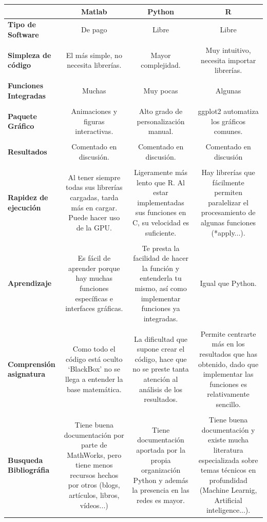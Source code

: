 \documentclass{article}
\begin{document}
\setlength{\tymin}{50pt}
\let\raggedright\RaggedRight
\begin{tabulary}{\textwidth}{LCCC}
\hline
&\textbf{Matlab}&\textbf{Python}&\textbf{R}\\\hline
\textbf{Tipo de Software} & De pago &Libre&Libre\\&&&\\
\textbf{Simpleza de código} & El más simple, no necesita librerías.
& Mayor complejidad.& Muy intuitivo, necesita importar librerías.\\&&&\\
\textbf{Funciones Integradas} &Muchas&Muy pocas&Algunas\\&&&\\
\textbf{Paquete Gráfico}&Animaciones y figuras interactivas.&
Alto grado de personalización manual.&
ggplot2 automatiza los gráficos comunes.\\&&&\\
\textbf{Resultados}&Comentado en discusión.&Comentado en discusión.&
Comentado en discusión\\&&&\\
\textbf{Rapidez de ejecución}&Al tener siempre todas sus librerías cargadas,
tarda más en cargar. Puede hacer uso de la GPU.&Ligeramente más lento
que R. Al estar implementadas sus funciones en C, su velocidad es
suficiente.& Hay librerías que fácilmente permiten paralelizar
el procesamiento de algunas funciones (*apply...).\\&&&\\
\textbf{Aprendizaje}&Es fácil de aprender porque hay muchas funciones
específicas e interfaces gráficas.& Te presta la facilidad de
hacer la función y entenderla tu mismo, así como implementar
funciones ya integradas.&Igual que Python.\\&&&\\
\textbf{Comprensión asignatura} &Como todo el código está oculto ‘BlackBox’ no
se llega a entender la base matemática.&La dificultad que supone
crear el código, hace que no se preste tanta atención al análisis
de los resultados. & Permite centrarte más en los resultados que has
obtenido, dado que implementar las funciones es relativamente
sencillo.\\&&&\\
\textbf{Busqueda Bibliográfia}& Tiene buena documentación por parte de
MathWorks, pero tiene menos recursos hechos por otros
(blogs, artículos, libros, vídeos...)&Tiene documentación
aportada por la propia organización Python y además la
presencia en las redes es mayor.&Tiene buena documentación y existe
mucha literatura especializada sobre temas técnicos en profundidad
(Machine Learnig, Artificial inteligence...).
\end{tabulary}
\newpage
\end{document}
